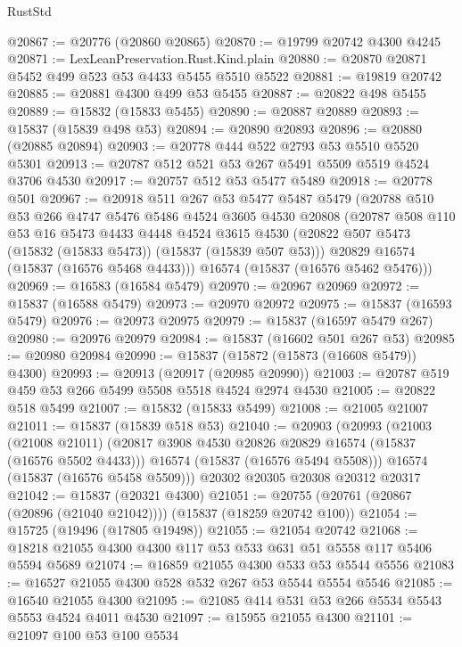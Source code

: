 \begin{lexlean}{RustStd}
\begin{coremodule}
{\begin{coremodule}
{{{{{{{{{{{{{{{{{{{{{{{{{{{{{{{{{{{{{{{{{{{{{{{{{{{{{{{{{{{{@20867 := @20776 (@20860 @20865)
@20870 := @19799 @20742 @4300 @4245
@20871 := LexLeanPreservation.Rust.Kind.plain
@20880 := @20870 @20871 @5452 @499 @523 @53 @4433 @5455 @5510 @5522
@20881 := @19819 @20742
@20885 := @20881 @4300 @499 @53 @5455
@20887 := @20822 @498 @5455
@20889 := @15832 (@15833 @5455)
@20890 := @20887 @20889
@20893 := @15837 (@15839 @498 @53)
@20894 := @20890 @20893
@20896 := @20880 (@20885 @20894)
@20903 := @20778 @444 @522 @2793 @53 @5510 @5520 @5301
@20913 := @20787 @512 @521 @53 @267 @5491 @5509 @5519 @4524 @3706 @4530
@20917 := @20757 @512 @53 @5477 @5489
@20918 := @20778 @501
@20967 := @20918
    @511
    @267
    @53
    @5477
    @5487
    @5479
    (@20788
      @510
      @53
      @266
      @4747
      @5476
      @5486
      @4524
      @3605
      @4530
      @20808
      (@20787
        @508
        @110
        @53
        @16
        @5473
        @4433
        @4448
        @4524
        @3615
        @4530
        (@20822 @507 @5473 (@15832 (@15833 @5473)) (@15837 (@15839 @507 @53)))
        @20829
        @16574
        (@15837 (@16576 @5468 @4433)))
      @16574
      (@15837 (@16576 @5462 @5476)))
@20969 := @16583 (@16584 @5479)
@20970 := @20967 @20969
@20972 := @15837 (@16588 @5479)
@20973 := @20970 @20972
@20975 := @15837 (@16593 @5479)
@20976 := @20973 @20975
@20979 := @15837 (@16597 @5479 @267)
@20980 := @20976 @20979
@20984 := @15837 (@16602 @501 @267 @53)
@20985 := @20980 @20984
@20990 := @15837 (@15872 (@15873 (@16608 @5479)) @4300)
@20993 := @20913 (@20917 (@20985 @20990))
@21003 := @20787 @519 @459 @53 @266 @5499 @5508 @5518 @4524 @2974 @4530
@21005 := @20822 @518 @5499
@21007 := @15832 (@15833 @5499)
@21008 := @21005 @21007
@21011 := @15837 (@15839 @518 @53)
@21040 := @20903
    (@20993
      (@21003
        (@21008 @21011)
        (@20817 @3908 @4530 @20826 @20829 @16574 (@15837 (@16576 @5502 @4433)))
        @16574
        (@15837 (@16576 @5494 @5508)))
      @16574
      (@15837 (@16576 @5458 @5509)))
    @20302
    @20305
    @20308
    @20312
    @20317
@21042 := @15837 (@20321 @4300)
@21051 := @20755 (@20761 (@20867 (@20896 (@21040 @21042)))) (@15837 (@18259 @20742 @100))
@21054 := @15725 (@19496 (@17805 @19498))
@21055 := @21054 @20742
@21068 := @18218 @21055 @4300 @4300 @117 @53 @533 @631 @51 @5558 @117 @5406 @5594 @5689
@21074 := @16859 @21055 @4300 @533 @53 @5544 @5556
@21083 := @16527 @21055 @4300 @528 @532 @267 @53 @5544 @5554 @5546
@21085 := @16540 @21055 @4300
@21095 := @21085 @414 @531 @53 @266 @5534 @5543 @5553 @4524 @4011 @4530
@21097 := @15955 @21055 @4300
@21101 := @21097 @100 @53 @100 @5534
}}}}}}}}}}}}}}}}}}}}}}}}}}}}}}}}}}}}}}}}}}}}}}}}}}}}}}}}}}}}
\end{coremodule}}
\end{coremodule}
\end{lexlean}
